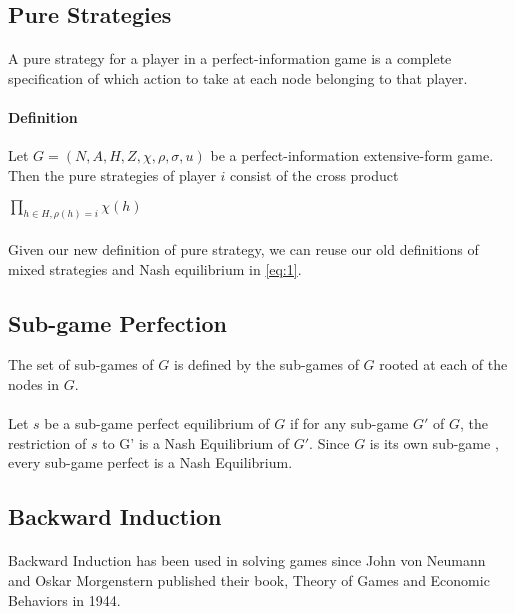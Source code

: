 \subsection{Pure Strategies}
\paragraph{} A pure strategy for a player in a perfect-information game is a complete specification of which action to take at each node belonging to that player.
\paragraph{Definition} Let $G = (N, A, H, Z,\chi ,\rho, \sigma, u ) $ be a perfect-information extensive-form game. Then the pure strategies of player $i$ consist of the cross product\\
\begin{center}
$ \prod_{h \in H, \rho(h)=i}\chi(h)$
\end{center}
\paragraph{}
Given our new definition of pure strategy, we can reuse our old definitions of mixed strategies and Nash equilibrium in \ref{eq:1}.
\subsection{Sub-game Perfection}

\begin{mydef}\label{def:def555}
The set of sub-games of $G$ is defined by the sub-games of $G$ rooted at each of the nodes in $G$.
\end{mydef}
\paragraph{}Let $s$ be a  sub-game perfect equilibrium of $G$ if for any sub-game $G'$ of $G$, the restriction of $s$ to G' is a Nash Equilibrium of $G'$. Since $G$ is its own sub-game , every sub-game perfect is a Nash Equilibrium.
\subsection{Backward Induction}
\paragraph{}Backward Induction has been used in solving games since John von Neumann and Oskar Morgenstern published their book, Theory of Games and Economic Behaviors in 1944.
